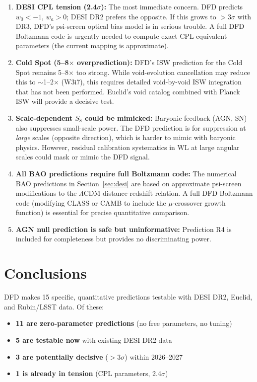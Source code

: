 \documentclass[12pt]{article}
\newcommand{\LCDM}{$\Lambda$CDM}
\begin{document}
\begin{enumerate}
\item \textbf{DESI CPL tension (2.4$\sigma$):} The most immediate concern. DFD predicts $w_0 < -1$, $w_a > 0$; DESI DR2 prefers the opposite. If this grows to $>3\sigma$ with DR3, DFD's psi-screen optical bias model is in serious trouble. A full DFD Boltzmann code is urgently needed to compute exact CPL-equivalent parameters (the current mapping is approximate).

\item \textbf{Cold Spot (5--8$\times$ overprediction):} DFD's ISW prediction for the Cold Spot remains 5--8$\times$ too strong. While void-evolution cancellation may reduce this to $\sim$1--2$\times$ (W3i7), this requires detailed void-by-void ISW integration that has not been performed. Euclid's void catalog combined with Planck ISW will provide a decisive test.

\item \textbf{Scale-dependent $S_8$ could be mimicked:} Baryonic feedback (AGN, SN) also suppresses small-scale power. The DFD prediction is for suppression at \emph{large} scales (opposite direction), which is harder to mimic with baryonic physics. However, residual calibration systematics in WL at large angular scales could mask or mimic the DFD signal.

\item \textbf{All BAO predictions require full Boltzmann code:} The numerical BAO predictions in Section~\ref{sec:desi} are based on approximate psi-screen modifications to the \LCDM{} distance-redshift relation. A full DFD Boltzmann code (modifying CLASS or CAMB to include the $\mu$-crossover growth function) is essential for precise quantitative comparison.

\item \textbf{AGN null prediction is safe but uninformative:} Prediction R4 is included for completeness but provides no discriminating power.
\end{enumerate}

\section{Conclusions}

DFD makes 15 specific, quantitative predictions testable with DESI DR2, Euclid, and Rubin/LSST data. Of these:
\begin{itemize}
\item \textbf{11 are zero-parameter predictions} (no free parameters, no tuning)
\item \textbf{5 are testable now} with existing DESI DR2 data
\item \textbf{3 are potentially decisive} ($>3\sigma$) within 2026--2027
\item \textbf{1 is already in tension} (CPL parameters, 2.4$\sigma$)
\end{itemize}
\end{document}
